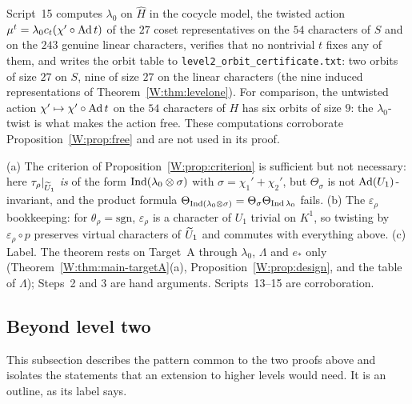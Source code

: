 \begin{remark}[Certificate]
Script~15 computes $\lambda_0$ on $\hat H$ in the cocycle model, the
twisted action $\mu^t=\lambda_0c_t(\chi'\circ\operatorname{Ad} t)$ of the $27$ coset
representatives on the $54$ characters of $S$ and on the $243$ genuine
linear characters, verifies that no nontrivial $t$ fixes any of them,
and writes the orbit table to \texttt{level2\_orbit\_certificate.txt}:
two orbits of size $27$ on $S$, nine of size $27$ on the linear
characters (the nine induced representations of
Theorem~\ref{W:thm:levelone}).  For comparison, the untwisted action
$\chi'\mapsto\chi'\circ\operatorname{Ad} t$ on the $54$ characters of $H$ has six
orbits of size $9$: the $\lambda_0$-twist is what makes the action free.
These computations corroborate Proposition~\ref{W:prop:free} and are not
used in its proof.
\end{remark}

\begin{remark}
(a) The criterion of Proposition~\ref{W:prop:criterion} is sufficient but
not necessary: here $\tau_\rho|_{\widetilde U_1}$ \emph{is} of the form
$\operatorname{Ind}(\lambda_0\otimes\sigma)$ with $\sigma=\chi_1'+\chi_2'$, but
$\Theta_\sigma$ is not $\operatorname{Ad}(U_1)$-invariant, and the product formula
$\Theta_{\operatorname{Ind}(\lambda_0\otimes\sigma)}=\Theta_\sigma\Theta_{\operatorname{Ind}\lambda_0}$
fails.
(b) The $\varepsilon_\rho$ bookkeeping: for $\theta_\rho=\mathrm{sgn}$,
$\varepsilon_\rho$ is a character of $U_1$ trivial on $K^1$, so twisting
by $\varepsilon_\rho\circ p$ preserves virtual characters of $\widetilde U_1$ and
commutes with everything above.
(c) Label.  The theorem rests on Target~A through $\lambda_0$, $\Lambda$
and $e_*$ only (Theorem~\ref{W:thm:main-targetA}(a),
Proposition~\ref{W:prop:design}, and the table of $\Lambda$); Steps~2 and
3 are hand arguments.  Scripts~13--15 are corroboration.
\end{remark}

\subsection{Beyond level two}\label{W:subsec:cuberoot}
This subsection describes the pattern common to the two proofs above and isolates the statements that an extension to higher levels would need. It is an outline, as its label says.

